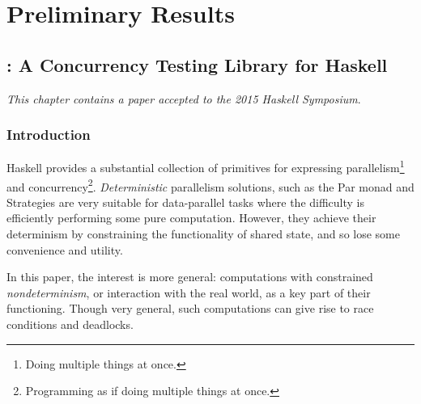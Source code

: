 \part{Preliminary Results}


\chapter{\dejafu{}: A Concurrency Testing Library for Haskell}
\label{chp:dejafu}

\textit{This chapter contains a paper accepted to the 2015 Haskell
  Symposium}\cite{dejafu}.

\section{Introduction}
\label{sec:dejafu-intro}

Haskell provides a substantial collection of primitives for expressing
parallelism\footnote{Doing multiple things at once.} and
concurrency\footnote{Programming as if doing multiple things at
  once.}. \textit{Deterministic} parallelism solutions, such as the
Par monad\cite{parmonad} and Strategies\cite{strategies} are very
suitable for data-parallel tasks where the difficulty is efficiently
performing some pure computation. However, they achieve their
determinism by constraining the functionality of shared state, and so
lose some convenience and utility.

In this paper, the interest is more general: computations with
constrained \textit{nondeterminism}, or interaction with the real
world, as a key part of their functioning. Though very general, such
computations can give rise to race conditions and deadlocks.

